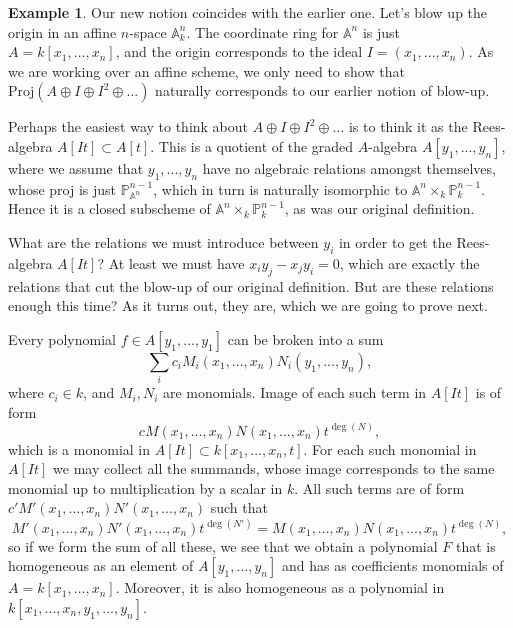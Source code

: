 \documentclass[12pt,a4paper,leqno]{article}
\newcommand{\Aff}{\mathbb{A}}
\newcommand{\Proj}{\mathbb{P}}
\newcommand{\proj}{\mathrm{Proj}}
\theoremstyle{plain}
\theoremstyle{definition}
\newtheorem{ex}[theo]{Example}
\theoremstyle{remark}
\begin{document}
\begin{ex}
Our new notion coincides with the earlier one. Let's blow up the origin in an affine $n$-space $\Aff_k^n$. The coordinate ring for $\Aff^n$ is just $A = k[x_1,...,x_n]$, and the origin corresponds to the ideal $I = (x_1,...,x_n)$. As we are working over an affine scheme, we only need to show that $\proj (A \oplus I \oplus I^2 \oplus ...)$ naturally corresponds to our earlier notion of blow-up.

Perhaps the easiest way to think about $A \oplus I \oplus I^2 \oplus ...$ is to think it as the Rees-algebra $A[It] \subset A[t]$. This is a quotient of the graded $A$-algebra $A[y_1, ... , y_n]$, where we assume that $y_1,...,y_n$ have no algebraic relations amongst themselves, whose proj is just $\Proj_{\Aff^n}^{n-1}$, which in turn is naturally isomorphic to $\Aff^n \times_k \Proj_k^{n-1}$. Hence it is a closed subscheme of $\Aff^n \times_k \Proj_k^{n-1}$, as was our original definition.

What are the relations we must introduce between $y_i$ in order to get the Rees-algebra $A[It]$? At least we must have $x_i y_j - x_j y_i = 0$, which are exactly the relations that cut the blow-up of our original definition. But are these relations enough this time? As it turns out, they are, which we are going to prove next.

Every polynomial $f \in A[y_1,...,y_1]$ can be broken into a sum
\begin{equation*}
\sum_i c_i M_i(x_1,...,x_n)N_i(y_1,...,y_n),
\end{equation*}
where $c_i \in k$, and $M_i, N_i$ are monomials. Image of each such term in $A[It]$ is of form
\begin{equation*}
c M(x_1,...,x_n)N(x_1,...,x_n)t^{\deg (N)},
\end{equation*}
which is a monomial in $A[It] \subset k[x_1,...,x_n,t]$. For each such monomial in $A[It]$ we may collect all the summands, whose image corresponds to the same monomial up to multiplication by a scalar in $k$. All such terms are of form $c' M'(x_1,...,x_n)N'(x_1,...,x_n)$ such that
\begin{equation*}
M'(x_1,...,x_n)N'(x_1,...,x_n)t^{\deg (N')} = M(x_1,...,x_n)N(x_1,...,x_n)t^{\deg (N)},
\end{equation*}
so if we form the sum of all these, we see that we obtain a polynomial $F$ that is homogeneous as an element of $A[y_1,...,y_n]$ and has as coefficients monomials of $A = k[x_1,...,x_n]$. Moreover, it is also homogeneous as a polynomial in $k[x_1,...,x_n,y_1,...,y_n]$.


\end{ex}
\end{document}
